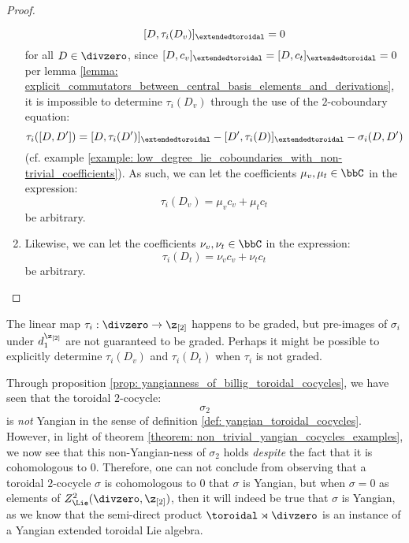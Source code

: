 \begin{proof}
\begin{enumerate}
                        $$[D, \tau_i(D_v)]_{\extendedtoroidal} = 0$$
                    for all $D \in \divzero$, since $[D, c_v]_{\extendedtoroidal} = [D, c_t]_{\extendedtoroidal} = 0$ per lemma \ref{lemma: explicit_commutators_between_central_basis_elements_and_derivations}, it is impossible to determine $\tau_i(D_v)$ through the use of the $2$-coboundary equation:
                        $$\tau_i([D, D']) = [D, \tau_i(D')]_{\extendedtoroidal} - [D', \tau_i(D)]_{\extendedtoroidal} - \sigma_i(D, D')$$
                    (cf. example \ref{example: low_degree_lie_coboundaries_with_non-trivial_coefficients}). As such, we can let the coefficients $\mu_v, \mu_t \in \bbC$ in the expression:
                        $$\tau_i(D_v) = \mu_v c_v + \mu_t c_t$$
                    be arbitrary.
                    \item Likewise, we can let the coefficients $\nu_v, \nu_t \in \bbC$ in the expression:
                        $$\tau_i(D_t) = \nu_v c_v + \nu_t c_t$$
                    be arbitrary.
                \end{enumerate}
            \end{proof}
        \begin{remark}
            The linear map $\tau_i: \divzero \to \z_{[2]}$ happens to be graded, but pre-images of $\sigma_i$ under $d_1^{\z_{[2]}}$ are not guaranteed to be graded. Perhaps it might be possible to explicitly determine $\tau_i(D_v)$ and $\tau_i(D_t)$ when $\tau_i$ is not graded.
        \end{remark}
        \begin{remark}
            Through proposition \ref{prop: yangianness_of_billig_toroidal_cocycles}, we have seen that the toroidal $2$-cocycle:
                $$\sigma_2$$
            is \textit{not} Yangian in the sense of definition \ref{def: yangian_toroidal_cocycles}. However, in light of theorem \ref{theorem: non_trivial_yangian_cocycles_examples}, we now see that this non-Yangian-ness of $\sigma_2$ holds \textit{despite} the fact that it is cohomologous to $0$. Therefore, one can not conclude from observing that a toroidal $2$-cocycle $\sigma$ is cohomologous to $0$ that $\sigma$ is Yangian, but when $\sigma = 0$ as elements of $Z^2_{\Lie}(\divzero, \z_{[2]})$, then it will indeed be true that $\sigma$ is Yangian, as we know that the semi-direct product $\toroidal \rtimes \divzero$ is an instance of a Yangian extended toroidal Lie algebra.
        \end{remark}